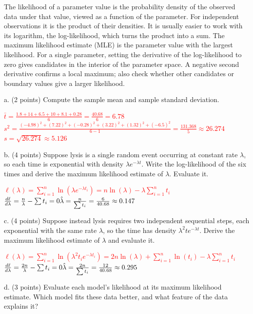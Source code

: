 \documentclass[11pt]{article}
\begin{document}
The likelihood of a parameter value is the probability density of the observed data under that value, viewed as a function of the parameter. For independent observations it is the product of their densities.  It is usually easier to work with its logarithm, the log-likelihood, which turns the product into a sum.  The maximum likelihood estimate (MLE) is the parameter value with the largest likelihood.  For a single parameter, setting the derivative of the log-likelihood to zero gives candidates in the interior of the parameter space. A negative second derivative confirms a local maximum; also check whether other candidates or boundary values give a larger likelihood.

a. (2 points) Compute the sample mean and sample standard deviation.

\textcolor{red}{
$\bar{t} = \frac{1.8 + 14 + 6.5 + 10 + 8.1 + 0.28}{6} = \frac{40.68}{6} = 6.78$\\
$s^2 = \frac{(-4.98)^2 + (7.22)^2 + (-0.28)^2 + (3.22)^2 + (1.32)^2 + (-6.5)^2}{6-1} = \frac{131.368}{5} \approx 26.274$\\
$s = \sqrt{26.274} \approx 5.126$
}

b. (4 points) Suppose lysis is a single random event occurring at constant rate $\lambda$, so each time is exponential with density
$\lambda e^{-\lambda t}$.  Write the log-likelihood of the six times and derive the maximum likelihood estimate of $\lambda$.  Evaluate it.

\textcolor{red}{
$\ell(\lambda) = \sum_{i=1}^n \ln(\lambda e^{-\lambda t_i}) = n \ln(\lambda) - \lambda \sum_{i=1}^n t_i$\\
$\frac{d\ell}{d\lambda} = \frac{n}{\lambda} - \sum t_i = 0\\
\hat{\lambda} = \frac{n}{\sum t_i} = \frac{6}{40.68} \approx 0.147$
}

c. (4 points) Suppose instead lysis requires two independent sequential steps, each exponential with the same rate $\lambda$, so the time has density $\lambda^2 t e^{-\lambda t}$.  Derive the maximum likelihood estimate of $\lambda$ and evaluate it.

\textcolor{red}{
$\ell(\lambda) = \sum_{i=1}^n \ln(\lambda^2 t_i e^{-\lambda t_i}) = 2n \ln(\lambda) + \sum_{i=1}^n \ln(t_i) - \lambda \sum_{i=1}^n t_i$\\
$\frac{d\ell}{d\lambda} = \frac{2n}{\lambda} - \sum t_i = 0\\
\hat{\lambda} = \frac{2n}{\sum t_i} = \frac{12}{40.68} \approx 0.295$
}

d. (3 points) Evaluate each model's likelihood at its maximum likelihood estimate.  Which model fits these data better, and what feature of the data explains it?
\end{document}
